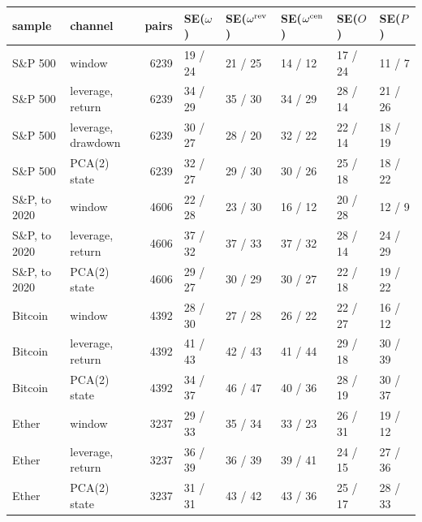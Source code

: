 \begin{tabular}{llrlllll}\toprule sample & channel & pairs & SE($\omega$) & SE($\omega^{\rm rev}$) & SE($\omega^{\rm cen}$) & SE($O$) & SE($P$)\\\midrule
S\&P 500 & window & 6239 & 19 / 24 & 21 / 25 & 14 / 12 & 17 / 24 & 11 / 7\\
S\&P 500 & leverage, return & 6239 & 34 / 29 & 35 / 30 & 34 / 29 & 28 / 14 & 21 / 26\\
S\&P 500 & leverage, drawdown & 6239 & 30 / 27 & 28 / 20 & 32 / 22 & 22 / 14 & 18 / 19\\
S\&P 500 & PCA(2) state & 6239 & 32 / 27 & 29 / 30 & 30 / 26 & 25 / 18 & 18 / 22\\
S\&P, to 2020 & window & 4606 & 22 / 28 & 23 / 30 & 16 / 12 & 20 / 28 & 12 / 9\\
S\&P, to 2020 & leverage, return & 4606 & 37 / 32 & 37 / 33 & 37 / 32 & 28 / 14 & 24 / 29\\
S\&P, to 2020 & PCA(2) state & 4606 & 29 / 27 & 30 / 29 & 30 / 27 & 22 / 18 & 19 / 22\\
Bitcoin & window & 4392 & 28 / 30 & 27 / 28 & 26 / 22 & 22 / 27 & 16 / 12\\
Bitcoin & leverage, return & 4392 & 41 / 43 & 42 / 43 & 41 / 44 & 29 / 18 & 30 / 39\\
Bitcoin & PCA(2) state & 4392 & 34 / 37 & 46 / 47 & 40 / 36 & 28 / 19 & 30 / 37\\
Ether & window & 3237 & 29 / 33 & 35 / 34 & 33 / 23 & 26 / 31 & 19 / 12\\
Ether & leverage, return & 3237 & 36 / 39 & 36 / 39 & 39 / 41 & 24 / 15 & 27 / 36\\
Ether & PCA(2) state & 3237 & 31 / 31 & 43 / 42 & 43 / 36 & 25 / 17 & 28 / 33\\
\bottomrule\end{tabular}
